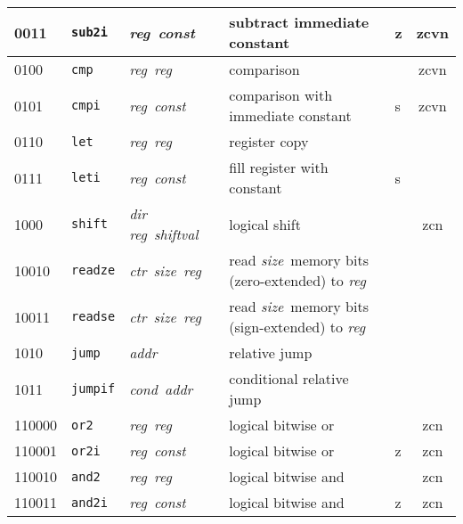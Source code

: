 \documentclass[architecture]{compas2018}
\newcommand{\reg}{\textit{reg}}
\newcommand{\const}{\textit{const}}
\newcommand{\shiftval}{\textit{shiftval}}
\newcommand{\cond}{\textit{cond}}
\newcommand{\ctr}{\textit{ctr}}
\newcommand{\size}{\textit{size}}
\newcommand{\addr}{\textit{addr}}
\begin{document}
\begin{table}[!h]
\begin{center}
\begin{tabular}{|l|l|l|l|l|c|}
    \hline
    0011    & \texttt{sub2i}  & \reg\ \const\                 & subtract immediate constant                          & z    & zcvn        \\
    \hline
    0100    & \texttt{cmp}    & \reg\ \reg\                   & comparison                                           &      & zcvn        \\
    \hline
    0101    & \texttt{cmpi}   & \reg\ \const\                 & comparison with immediate constant                   & s    & zcvn        \\
    \hline
    0110    & \texttt{let}    & \reg\ \reg\                   & register copy                                        &      &             \\
    \hline
    0111    & \texttt{leti}   & \reg\ \const\                 & fill register with constant                          & s    &             \\
    \hline
    1000    & \texttt{shift}  & \textit{dir} \reg\ \shiftval\ & logical shift                                        &      & zcn         \\
    \hline
    10010   & \texttt{readze} & \ctr\ \size\ \reg\            & read \size\ memory bits (zero-extended) to \reg\     &      &             \\
    10011   & \texttt{readse} & \ctr\ \size\ \reg\            & read \size\ memory bits (sign-extended) to \reg\     &      &             \\
    \hline
    1010    & \texttt{jump}   & \addr\                        & relative jump                                        &      &             \\
    \hline
    1011    & \texttt{jumpif} & \cond\ \addr\                 & conditional relative jump                            &      &             \\
    \hline
    110000  & \texttt{or2}    & \reg\ \reg\                   & logical bitwise or                                   &      & zcn         \\
    \hline
    110001  & \texttt{or2i}   & \reg\ \const\                 & logical bitwise or                                   & {z}  & zcn         \\
    \hline
    110010  & \texttt{and2}   & \reg\ \reg\                   & logical bitwise and                                  &      & zcn         \\
    \hline
    110011  & \texttt{and2i}  & \reg\ \const\                 & logical bitwise and                                  & {z}  & zcn         \\

\end{tabular}
\end{center}
\end{table}
\end{document}
